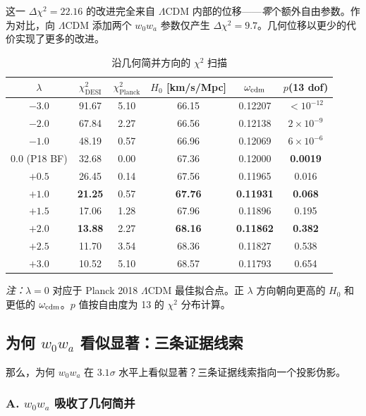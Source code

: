 \documentclass[12pt]{ctexart}
\begin{document}
这一 $\Delta\chi^2 = 22.16$ 的改进完全来自 $\Lambda$CDM 内部的位移——{\em 零}个额外自由参数。作为对比，向 $\Lambda$CDM 添加两个 $w_0 w_a$ 参数仅产生 $\Delta\chi^2 = 9.7$。几何位移以更少的代价实现了更多的改进。

\begin{table}[t]
\centering
\caption{沿几何简并方向的 $\chi^2$ 扫描}
\label{tab:scan}
\begin{tabular}{cccccc}
\toprule
$\lambda$ & $\chi^2_{\mathrm{DESI}}$ & $\chi^2_{\mathrm{Planck}}$ & $H_0$ [km/s/Mpc] & $\omega_{\rm cdm}$ & $p$(13 dof) \\
\midrule
$-3.0$ & 91.67 & 5.10 & 66.15 & 0.12207 & $<10^{-12}$ \\
$-2.0$ & 67.84 & 2.27 & 66.56 & 0.12138 & $2\times10^{-9}$ \\
$-1.0$ & 48.19 & 0.57 & 66.96 & 0.12069 & $6\times10^{-6}$ \\
$0.0$ (P18 BF) & 32.68 & 0.00 & 67.36 & 0.12000 & \textbf{0.0019} \\
$+0.5$ & 26.45 & 0.14 & 67.56 & 0.11965 & 0.016 \\
$+1.0$ & \textbf{21.25} & 0.57 & \textbf{67.76} & \textbf{0.11931} & \textbf{0.068} \\
$+1.5$ & 17.06 & 1.28 & 67.96 & 0.11896 & 0.195 \\
$+2.0$ & \textbf{13.88} & 2.27 & \textbf{68.16} & \textbf{0.11862} & \textbf{0.382} \\
$+2.5$ & 11.70 & 3.54 & 68.36 & 0.11827 & 0.538 \\
$+3.0$ & 10.52 & 5.10 & 68.57 & 0.11793 & 0.654 \\
\bottomrule
\end{tabular}
\vspace{0.3cm}
\par\small\textit{注：}$\lambda=0$ 对应于 Planck 2018 $\Lambda$CDM 最佳拟合点。正 $\lambda$ 方向朝向更高的 $H_0$ 和更低的 $\omega_{\rm cdm}$。$p$ 值按自由度为 13 的 $\chi^2$ 分布计算。
\end{table}

\subsection{为何 $w_0 w_a$ 看似显著：三条证据线索}

那么，为何 $w_0 w_a$ 在 $3.1\sigma$ 水平上看似显著？三条证据线索指向一个投影伪影。

\subsubsection{A. $w_0 w_a$ 吸收了几何简并}
\end{document}
